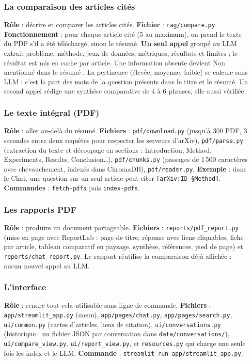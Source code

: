\documentclass[11pt,a4paper]{article}
\newcommand{\code}[1]{\texttt{#1}}
\begin{document}
\subsubsection{La comparaison des articles cités}
\textbf{Rôle} : décrire et comparer les articles cités. \textbf{Fichier} :
\code{rag/compare.py}. \textbf{Fonctionnement} : pour chaque article cité (5 au maximum),
on prend le texte du PDF s'il a été téléchargé, sinon le résumé. \textbf{Un seul appel}
groupé au LLM extrait problème, méthode, jeux de données, métriques, résultats et limites ;
le résultat est mis en cache par article. Une information absente devient
\og Non mentionné dans le résumé \fg{}. La pertinence (élevée, moyenne, faible) se calcule
sans LLM : c'est la part des mots de la question présents dans le titre et le résumé.
Un second appel rédige une synthèse comparative de 4 à 6 phrases, elle aussi vérifiée.

\subsubsection{Le texte intégral (PDF)}
\textbf{Rôle} : aller au-delà du résumé. \textbf{Fichiers} : \code{pdf/download.py}
(jusqu'à 300 PDF, 3 secondes entre deux requêtes pour respecter les serveurs d'arXiv),
\code{pdf/parse.py} (extraction du texte et découpage en sections : Introduction, Method,
Experiments, Results, Conclusion\ldots), \code{pdf/chunks.py} (passages de 1\,500 caractères
avec chevauchement, indexés dans ChromaDB), \code{pdf/reader.py}. \textbf{Exemple} : dans
le Chat, une question sur un seul article peut citer \code{[arXiv:ID \S Method]}.
\textbf{Commandes} : \code{fetch-pdfs} puis \code{index-pdfs}.

\subsubsection{Les rapports PDF}
\textbf{Rôle} : produire un document partageable. \textbf{Fichiers} :
\code{reports/pdf\_report.py} (mise en page avec ReportLab : page de titre, réponse avec
liens cliquables, fiche par article, tableau comparatif en paysage, synthèse, références,
pied de page) et \code{reports/chat\_report.py}. Le rapport réutilise la comparaison déjà
affichée : aucun nouvel appel au LLM.

\subsubsection{L'interface}
\textbf{Rôle} : rendre tout cela utilisable sans ligne de commande. \textbf{Fichiers} :
\code{app/streamlit\_app.py} (menu), \code{app/pages/chat.py}, \code{app/pages/search.py},
\code{ui/common.py} (cartes d'articles, liens de citation), \code{ui/conversations.py}
(historique : un fichier JSON par conversation dans \code{data/conversations/}),
\code{ui/compare\_view.py}, \code{ui/report\_view.py}, et \code{resources.py} qui charge une
seule fois les index et le LLM. \textbf{Commande} : \code{streamlit run app/streamlit\_app.py}.
\end{document}
